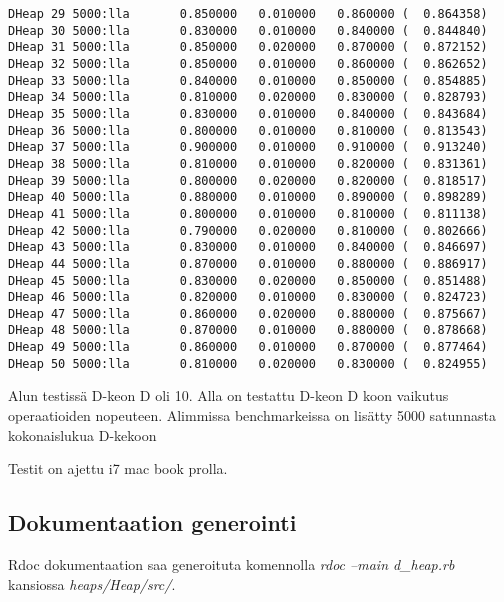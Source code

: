\documentclass[a4paper,12pt]{article}
\begin{document}
\begin{verbatim}
DHeap 29 5000:lla       0.850000   0.010000   0.860000 (  0.864358)
DHeap 30 5000:lla       0.830000   0.010000   0.840000 (  0.844840)
DHeap 31 5000:lla       0.850000   0.020000   0.870000 (  0.872152)
DHeap 32 5000:lla       0.850000   0.010000   0.860000 (  0.862652)
DHeap 33 5000:lla       0.840000   0.010000   0.850000 (  0.854885)
DHeap 34 5000:lla       0.810000   0.020000   0.830000 (  0.828793)
DHeap 35 5000:lla       0.830000   0.010000   0.840000 (  0.843684)
DHeap 36 5000:lla       0.800000   0.010000   0.810000 (  0.813543)
DHeap 37 5000:lla       0.900000   0.010000   0.910000 (  0.913240)
DHeap 38 5000:lla       0.810000   0.010000   0.820000 (  0.831361)
DHeap 39 5000:lla       0.800000   0.020000   0.820000 (  0.818517)
DHeap 40 5000:lla       0.880000   0.010000   0.890000 (  0.898289)
DHeap 41 5000:lla       0.800000   0.010000   0.810000 (  0.811138)
DHeap 42 5000:lla       0.790000   0.020000   0.810000 (  0.802666)
DHeap 43 5000:lla       0.830000   0.010000   0.840000 (  0.846697)
DHeap 44 5000:lla       0.870000   0.010000   0.880000 (  0.886917)
DHeap 45 5000:lla       0.830000   0.020000   0.850000 (  0.851488)
DHeap 46 5000:lla       0.820000   0.010000   0.830000 (  0.824723)
DHeap 47 5000:lla       0.860000   0.020000   0.880000 (  0.875667)
DHeap 48 5000:lla       0.870000   0.010000   0.880000 (  0.878668)
DHeap 49 5000:lla       0.860000   0.010000   0.870000 (  0.877464)
DHeap 50 5000:lla       0.810000   0.020000   0.830000 (  0.824955)
\end{verbatim} 
\normalsize
Alun testissä  D-keon D oli 10. Alla on testattu D-keon D koon vaikutus operaatioiden nopeuteen. Alimmissa benchmarkeissa on lisätty 5000 satunnasta kokonaislukua D-kekoon

Testit on ajettu i7 mac book prolla.

\subsection{Dokumentaation generointi}
Rdoc dokumentaation saa generoituta komennolla \emph{rdoc --main d\_heap.rb} kansiossa  \emph{heaps/Heap/src/}.
\end{document}
